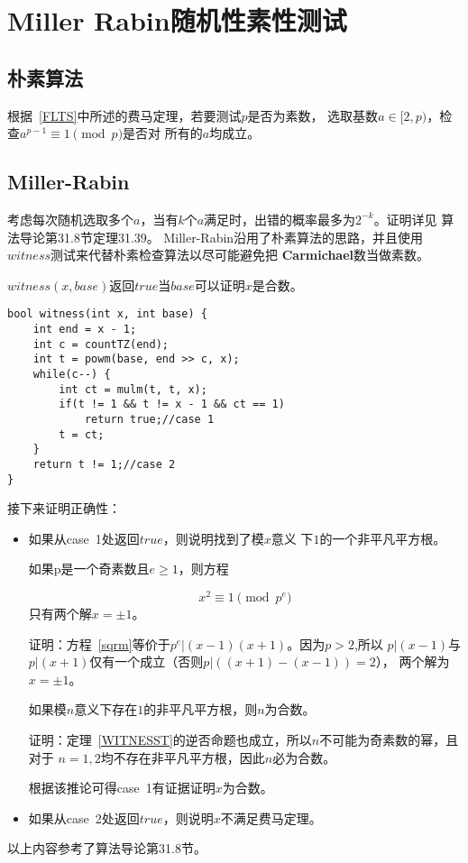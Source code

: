 \section{Miller Rabin随机性素性测试}
\subsection{朴素算法}
根据~\ref{FLTS}中所述的费马定理，若要测试$p$是否为素数，
选取基数$a\in [2,p)$，检查$a^{p-1}\equiv 1 \pmod{p}$是否对
所有的$a$均成立。
\subsection{Miller-Rabin}
考虑每次随机选取多个$a$，当有$k$个$a$满足时，出错的概率最多为$2^{-k}$。证明详见
算法导论\cite{ITA3}第31.8节定理31.39。
Miller-Rabin沿用了朴素算法的思路，并且使用$witness$测试来代替朴素检查算法以尽可能避免把
{\bfseries Carmichael}数当做素数。

$witness(x,base)$返回$true$当$base$可以证明$x$是合数。
\begin{lstlisting}[title=witness]
bool witness(int x, int base) {
    int end = x - 1;
    int c = countTZ(end);
    int t = powm(base, end >> c, x);
    while(c--) {
        int ct = mulm(t, t, x);
        if(t != 1 && t != x - 1 && ct == 1)
            return true;//case 1
        t = ct;
    }
    return t != 1;//case 2
}
\end{lstlisting}
接下来证明正确性：
\begin{itemize}
	\item 如果从case~1处返回$true$，则说明找到了模$x$意义
            下$1$的一个非平凡平方根。

          \begin{theorem}\label{WITNESST}
              如果p是一个奇素数且$e\geq 1$，则方程

              \begin{equation}\label{sqrm}
                   x^2 \equiv 1 \pmod{p^e}
              \end{equation}
              只有两个解$x=\pm 1$。
	      \end{theorem}

          证明：方程~\ref{sqrm}等价于$p^e|(x-1)(x+1)$。因为$p>2$,所以
          $p|(x-1)$与$p|(x+1)$仅有一个成立（否则$p|((x+1)-(x-1))=2$），
          两个解为$x=\pm 1$。

	      \begin{inference}
		      如果模$n$意义下存在$1$的非平凡平方根，则$n$为合数。
	      \end{inference}

	      证明：定理~\ref{WITNESST}的逆否命题也成立，所以$n$不可能为奇素数的幂，且对于
	      $n=1,2$均不存在非平凡平方根，因此$n$必为合数。

	      根据该推论可得case~1有证据证明$x$为合数。
	\item 如果从case~2处返回$true$，则说明$x$不满足费马定理。
\end{itemize}
以上内容参考了算法导论\cite{ITA3}第31.8节。
